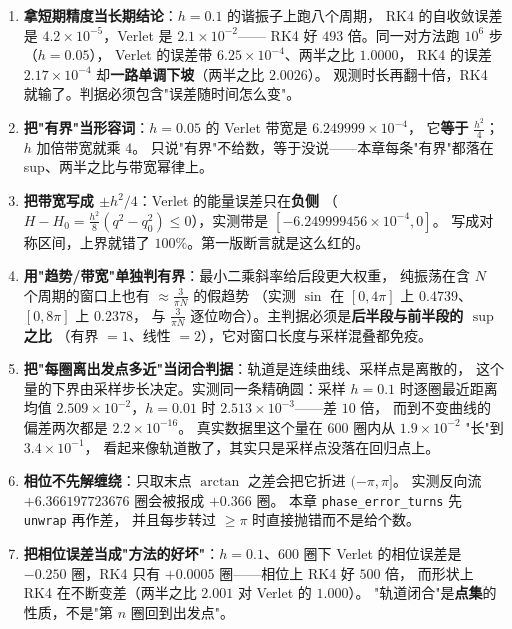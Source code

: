 \begin{enumerate}
  \item \textbf{拿短期精度当长期结论}：$h=0.1$ 的谐振子上跑八个周期，
        RK4 的自收敛误差是 $4.2\times10^{-5}$，Verlet 是 $2.1\times10^{-2}$——
        RK4 好 $493$ 倍。同一对方法跑 $10^6$ 步（$h=0.05$），
        Verlet 的误差带 $6.25\times10^{-4}$、两半之比 $1.0000$，
        RK4 的误差 $2.17\times10^{-4}$ 却\textbf{一路单调下坡}（两半之比 $2.0026$）。
        观测时长再翻十倍，RK4 就输了。判据必须包含"误差随时间怎么变"。
  \item \textbf{把"有界"当形容词}：$h=0.05$ 的 Verlet 带宽是 $6.249999\times10^{-4}$，
        它\textbf{等于} $\tfrac{h^2}{4}$；$h$ 加倍带宽就乘 $4$。
        只说"有界"不给数，等于没说——本章每条"有界"都落在 sup、两半之比与带宽幂律上。
  \item \textbf{把带宽写成 $\pm h^2/4$}：Verlet 的能量误差只在\textbf{负侧}
        （$H-H_0=\tfrac{h^2}{8}(q^2-q_0^2)\le0$），实测带是 $[-6.249999456\times10^{-4},0]$。
        写成对称区间，上界就错了 $100\%$。第一版断言就是这么红的。
  \item \textbf{用"趋势/带宽"单独判有界}：最小二乘斜率给后段更大权重，
        纯振荡在含 $N$ 个周期的窗口上也有 $\approx\tfrac{3}{\pi N}$ 的假趋势
        （实测 $\sin$ 在 $[0,4\pi]$ 上 $0.4739$、$[0,8\pi]$ 上 $0.2378$，
        与 $\tfrac{3}{\pi N}$ 逐位吻合）。主判据必须是\textbf{后半段与前半段的 $\sup$ 之比}
        （有界 $=1$、线性 $=2$），它对窗口长度与采样混叠都免疫。
  \item \textbf{把"每圈离出发点多近"当闭合判据}：轨道是连续曲线、采样点是离散的，
        这个量的下界由采样步长决定。实测同一条精确圆：采样 $h=0.1$ 时逐圈最近距离均值
        $2.509\times10^{-2}$，$h=0.01$ 时 $2.513\times10^{-3}$——差 $10$ 倍，
        而到不变曲线的偏差两次都是 $2.2\times10^{-16}$。
        真实数据里这个量在 $600$ 圈内从 $1.9\times10^{-2}$ "长"到 $3.4\times10^{-1}$，
        看起来像轨道散了，其实只是采样点没落在回归点上。
  \item \textbf{相位不先解缠绕}：只取末点 $\arctan$ 之差会把它折进 $(-\pi,\pi]$。
        实测反向流 $+6.366197723676$ 圈会被报成 $+0.366$ 圈。
        本章 \texttt{phase\_\allowbreak error\_\allowbreak turns} 先 \texttt{unwrap} 再作差，
        并且每步转过 $\ge\pi$ 时直接抛错而不是给个数。
  \item \textbf{把相位误差当成"方法的好坏"}：$h=0.1$、$600$ 圈下 Verlet 的相位误差是
        $-0.250$ 圈，RK4 只有 $+0.0005$ 圈——相位上 RK4 好 $500$ 倍，
        而形状上 RK4 在不断变差（两半之比 $2.001$ 对 Verlet 的 $1.000$）。
        "轨道闭合"是\textbf{点集}的性质，不是"第 $n$ 圈回到出发点"。

\end{enumerate}
